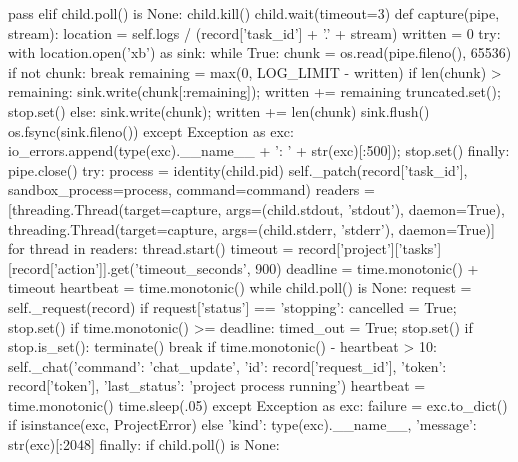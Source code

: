                         pass
                elif child.poll() is None:
                    child.kill()
                child.wait(timeout=3)
        def capture(pipe, stream):
            location = self.logs / (record['task_id'] + '.' + stream)
            written = 0
            try:
                with location.open('xb') as sink:
                    while True:
                        chunk = os.read(pipe.fileno(), 65536)
                        if not chunk:
                            break
                        remaining = max(0, LOG_LIMIT - written)
                        if len(chunk) > remaining:
                            sink.write(chunk[:remaining]); written += remaining
                            truncated.set(); stop.set()
                        else:
                            sink.write(chunk); written += len(chunk)
                        sink.flush()
                    os.fsync(sink.fileno())
            except Exception as exc:
                io_errors.append(type(exc).__name__ + ': ' + str(exc)[:500]); stop.set()
            finally:
                pipe.close()
        try:
            process = identity(child.pid)
            self._patch(record['task_id'], sandbox_process=process, command=command)
            readers = [threading.Thread(target=capture, args=(child.stdout, 'stdout'), daemon=True),
                       threading.Thread(target=capture, args=(child.stderr, 'stderr'), daemon=True)]
            for thread in readers:
                thread.start()
            timeout = record['project']['tasks'][record['action']].get('timeout_seconds', 900)
            deadline = time.monotonic() + timeout
            heartbeat = time.monotonic()
            while child.poll() is None:
                request = self._request(record)
                if request['status'] == 'stopping':
                    cancelled = True; stop.set()
                if time.monotonic() >= deadline:
                    timed_out = True; stop.set()
                if stop.is_set():
                    terminate()
                    break
                if time.monotonic() - heartbeat > 10:
                    self._chat({'command': 'chat_update', 'id': record['request_id'], 'token': record['token'],
                                'last_status': 'project process running'})
                    heartbeat = time.monotonic()
                time.sleep(.05)
        except Exception as exc:
            failure = exc.to_dict() if isinstance(exc, ProjectError) else {'kind': type(exc).__name__, 'message': str(exc)[:2048]}
        finally:
            if child.poll() is None:
